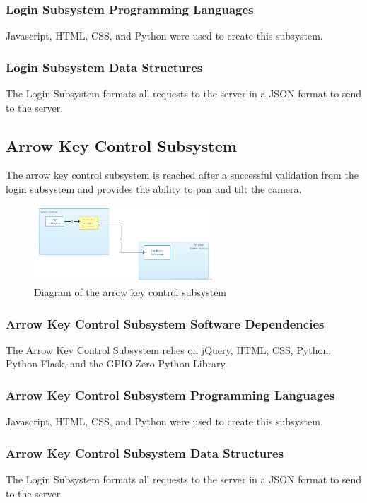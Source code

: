 \subsubsection{Login Subsystem Programming Languages}
Javascript, HTML, CSS, and Python were used to create this subsystem.

\subsubsection{Login Subsystem Data Structures}
The Login Subsystem formats all requests to the server in a JSON format to send to the server.


\subsection{Arrow Key Control Subsystem}
The arrow key control subsystem is reached after a successful validation from the login subsystem and provides the ability to pan and tilt the camera.

\begin{figure}[h!]
	\centering
 	\includegraphics[width=0.60\textwidth]{images/ADSdiagrams/arrowkeycontrolsubsystem.png}
 \caption{Diagram of the arrow key control subsystem}
\end{figure}

\subsubsection{Arrow Key Control Subsystem Software Dependencies}
The Arrow Key Control Subsystem relies on jQuery, HTML, CSS, Python, Python Flask, and the GPIO Zero Python Library. 

\subsubsection{Arrow Key Control Subsystem Programming Languages}
Javascript, HTML, CSS, and Python were used to create this subsystem.

\subsubsection{Arrow Key Control Subsystem Data Structures}
The Login Subsystem formats all requests to the server in a JSON format to send to the server.

